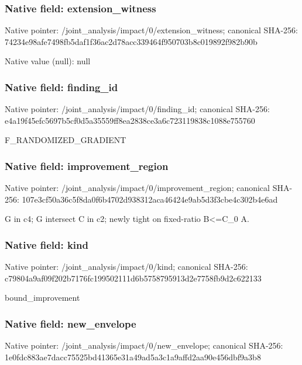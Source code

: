 \documentclass[10pt,a4paper]{article}
\begin{document}
\subsubsection{Native field: extension\_\allowbreak{}witness}
Native pointer: /joint\_\allowbreak{}analysis/impact/0/extension\_\allowbreak{}witness; canonical SHA-256: 74234e98afe7498fb5daf1f36ac2d78acc339464f950703b8c019892f982b90b

Native value (null): null

\subsubsection{Native field: finding\_\allowbreak{}id}
Native pointer: /joint\_\allowbreak{}analysis/impact/0/finding\_\allowbreak{}id; canonical SHA-256: e4a19f45efc5697b5cf0d5a35559ff8ea2838ce3a6c723119838c1088e755760

\begingroup\raggedright\sloppy F\_\allowbreak{}RANDOMIZED\_\allowbreak{}GRADIENT\par\endgroup

\subsubsection{Native field: improvement\_\allowbreak{}region}
Native pointer: /joint\_\allowbreak{}analysis/impact/0/improvement\_\allowbreak{}region; canonical SHA-256: 107e3cf50a36c5f8da0f6b4702d938312aca46424e9ab5d3f3cbe4c302b4e6ad

\begingroup\raggedright\sloppy G in c4;\allowbreak{} G intersect C in c2;\allowbreak{} newly tight on fixed-ratio B<=\allowbreak{}C\_\allowbreak{}0 A.\par\endgroup

\subsubsection{Native field: kind}
Native pointer: /joint\_\allowbreak{}analysis/impact/0/kind; canonical SHA-256: c79804a9af09f202b7176fc199502111d6b5758795913d2e7758fb9d2c622133

\begingroup\raggedright\sloppy bound\_\allowbreak{}improvement\par\endgroup

\subsubsection{Native field: new\_\allowbreak{}envelope}
Native pointer: /joint\_\allowbreak{}analysis/impact/0/new\_\allowbreak{}envelope; canonical SHA-256: 1e0fdc883ae7dacc75525bd41365e31a49ad5a3c1a9affd2aa90e456dbf9a3b8
\end{document}
